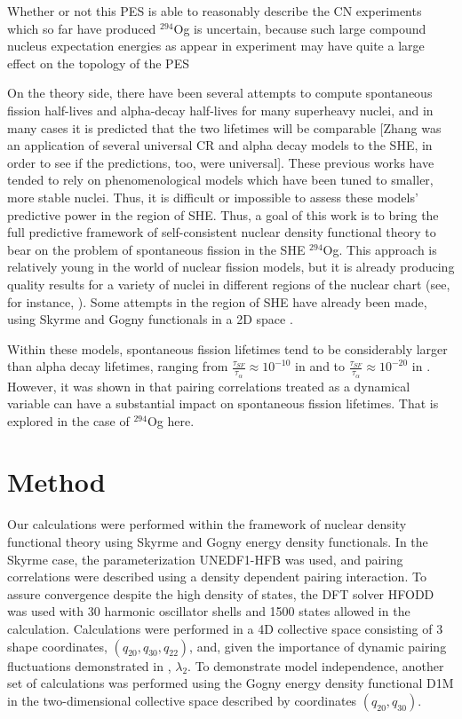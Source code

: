 Whether or not this PES is able to reasonably describe the CN experiments which so far have produced $^{294}$Og is uncertain, because such large compound nucleus expectation energies as appear in experiment may have quite a large effect on the topology of the PES \cite{Pei2009}

On the theory side, there have been several attempts to compute spontaneous fission half-lives and alpha-decay half-lives for many superheavy nuclei, and in many cases it is predicted that the two lifetimes will be comparable \cite{Poenaru2011, Poenaru2012, Zhang2018} [Zhang was an application of several universal CR and alpha decay models to the SHE, in order to see if the predictions, too, were universal]. These previous works have tended to rely on phenomenological models which have been tuned to smaller, more stable nuclei. Thus, it is difficult or impossible to assess these models' predictive power in the region of SHE. Thus, a goal of this work is to bring the full predictive framework of self-consistent nuclear density functional theory to bear on the problem of spontaneous fission in the SHE $^{294}$Og. This approach is relatively young in the world of nuclear fission models, but it is already producing quality results for a variety of nuclei in different regions of the nuclear chart (see, for instance, \cite{Mcdonnell2014, Sadhukhan2017, Sadhukhan2016, Tsekhanovich2018}). Some attempts in the region of SHE have already been made, using Skyrme and Gogny functionals in a 2D space \cite{Reinhard2017, Giuliani2017, Warda2012, Baran2015}.

Within these models, spontaneous fission lifetimes tend to be considerably larger than alpha decay lifetimes, ranging from $\frac{\tau_{SF}}{\tau_{\alpha}}\approx10^{-10}$ in \cite{Baran2015} and \cite{Reinhard2017} to $\frac{\tau_{SF}}{\tau_{\alpha}}\approx10^{-20}$ in \cite{Warda2012}. However, it was shown in \cite{Sadhukhan2014} that pairing correlations treated as a dynamical variable can have a substantial impact on spontaneous fission lifetimes. That is explored in the case of $^{294}$Og here.

\section{Method}

Our calculations were performed within the framework of nuclear density functional theory using Skyrme and Gogny energy density functionals. In the Skyrme case, the parameterization UNEDF1-HFB \cite{Schunck2015} was used, and pairing correlations were described using a density dependent pairing interaction. To assure convergence despite the high density of states, the DFT solver HFODD was used with 30 harmonic oscillator shells and 1500 states allowed in the calculation. Calculations were performed in a 4D collective space consisting of 3 shape coordinates, $(q_{20}, q_{30}, q_{22})$, and, given the importance of dynamic pairing fluctuations demonstrated in \cite{Sadhukhan2014}, $\lambda_2$. To demonstrate model independence, another set of calculations was performed using the Gogny energy density functional D1M in the two-dimensional collective space described by coordinates $(q_{20},q_{30})$.

